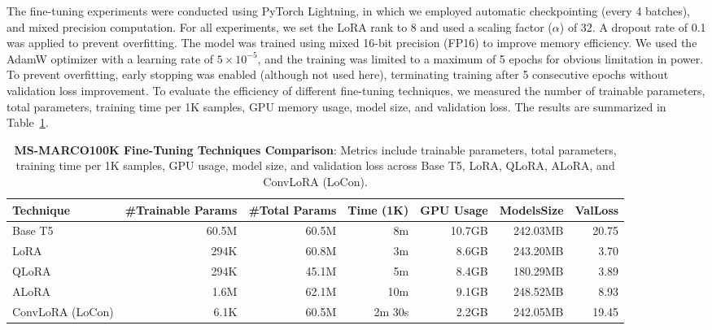 The fine-tuning experiments were conducted using PyTorch Lightning, in which we employed automatic checkpointing (every 4 batches), and mixed precision computation. For all experiments, we set the LoRA rank to 8 and used a scaling factor (\(\alpha\)) of 32. A dropout rate of 0.1 was applied to prevent overfitting. The model was trained using mixed 16-bit precision (FP16) to improve memory efficiency. We used the AdamW optimizer with a learning rate of \(5 \times 10^{-5}\), and the training was limited to a maximum of 5 epochs for obvious limitation in power. To prevent overfitting, early stopping was enabled (although not used here), terminating training after 5 consecutive epochs without validation loss improvement. 
To evaluate the efficiency of different fine-tuning techniques, we measured the number of trainable parameters, total parameters, training time per 1K samples, GPU memory usage, model size, and validation loss. The results are summarized in Table~\ref{tab:results_comparison}.

\begin{table}[ht]
    \centering
    \small
    \begin{tabular}{l|rrrrrr}
    \toprule
    \textbf{Technique} & \textbf{\#Trainable Params} & \textbf{\#Total Params} & \textbf{Time (1K)} & \textbf{GPU Usage} & \textbf{ModelsSize} & \textbf{ValLoss} \\
    \midrule
    Base T5         & 60.5M & 60.5M & 8m & 10.7GB & 242.03MB & 20.75\\
    LoRA            & 294K & 60.8M & 3m & 8.6GB & 243.20MB & 3.70\\
    QLoRA           & 294K & 45.1M & 5m & 8.4GB & 180.29MB & 3.89\\
    ALoRA           & 1.6M & 62.1M & 10m & 9.1GB & 248.52MB & 8.93\\
    ConvLoRA (LoCon)& 6.1K & 60.5M & 2m 30s & 2.2GB & 242.05MB & 19.45\\
    \bottomrule
    \end{tabular}
    \caption{\textbf{MS-MARCO100K Fine-Tuning Techniques Comparison}: Metrics include trainable parameters, total parameters, training time per 1K samples, GPU usage, model size, and validation loss across Base T5, LoRA, QLoRA, ALoRA, and ConvLoRA (LoCon).}
    \label{tab:results_comparison}
\end{table}

